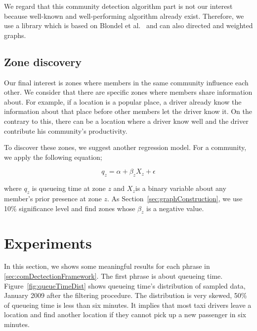 \documentclass{article}
\begin{document}
We regard that this community detection algorithm part is not our interest because well-known and well-performing algorithm already exist. Therefore, we use a library which is based on  Blondel et al.~ and can also directed and weighted graphs.


\subsection{Zone discovery} \label{sec:zoneDiscovery}

Our final interest is zones where members in the same community influence each other. We consider that there are specific zones where members share information about. For example, if a location is a popular place, a driver already know the information about that place before other members let the driver know it. On the contrary to this, there can be a location where a driver know well and the driver contribute his community's productivity.

To discover these zones, we suggest another regression model. For a community, we apply the following equation;

\begin{equation} \label{eq:zoneRegression}
	q_{z}= \alpha + \beta_{z}X_{z} + \epsilon
\end{equation}

\noindent where $q_{z}$ is queueing time at zone $z$ and $X_{z}$is a binary variable about any member's prior presence at zone $z$. As Section~\ref{sec:graphConstruction}, we use 10\% significance level and find zones whose $\beta_{z}$ is a negative value.

\section{Experiments} \label{sec:experiments}

In this section, we shows some meaningful results for each phrase in \ref{sec:comDectectionFramework}. The first phrase is about queueing time. Figure~\ref{fig:queueTimeDist} shows queueing time's distribution of sampled data, January 2009 after the filtering procedure. The distribution is very skewed, 50\% of queueing time is less than six minutes. It implies that most taxi drivers leave a location and find another location if they cannot pick up a new passenger in six minutes. 
\end{document}

